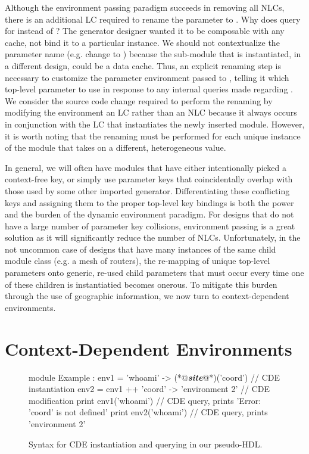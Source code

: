 Although the environment passing paradigm succeeds in removing all NLCs,
there is an additional LC required to rename the  parameter to .
Why does  query for  instead of ?
The generator designer wanted it to be composable with any cache, not bind it to a particular instance.
We should not contextualize the parameter name (e.g. change  to ) because the sub-module that is instantiated, in a different design, could be a data cache. 
Thus, an explicit renaming step is necessary to customize the parameter environment passed to , telling it which top-level parameter to use
in response to any internal queries made regarding .
We consider the source code change required to perform the renaming by modifying the environment an LC rather than an NLC because it always occurs in conjunction
with the LC that instantiates the newly inserted module.
However, it is worth noting that the renaming must be performed for each unique instance of the module that takes on a different, heterogeneous value.

In general, we will often have modules that have either intentionally picked a context-free key, or simply use parameter keys that coincidentally overlap with those
used by some other imported generator.
Differentiating these conflicting keys and assigning them to the proper top-level key bindings is both the power and the burden of the dynamic environment paradigm.
For designs that do not have a large number of parameter key collisions, environment passing is a great solution as it will significantly reduce the number of NLCs. 
Unfortunately, in the not uncommon case of designs that have many instances of the same child module class (e.g. a mesh of routers), the re-mapping of unique top-level parameters onto generic, re-used child parameters
that must occur every time one of these children is instantiatied becomes onerous.
To mitigate this burden through the use of geographic information, we now turn to context-dependent environments.

\section{Context-Dependent Environments}
\label{sec:cde}

\begin{figure}
\centering
\begin{phdl}
module Example :
  env1 = {'whoami' -> (*@\textcolor[rgb]{1,0.5,0}{\textbf{\textit{site}}}@*)('coord')}                // CDE instantiation
  env2 = env1 ++ {'coord' -> 'environment 2'} // CDE modification
  print env1('whoami')                        // CDE query, prints 'Error: 'coord' is not defined'
  print env2('whoami')                        // CDE query, prints 'environment 2'
\end{phdl}
\caption{Syntax for CDE instantiation and querying in our pseudo-HDL.}
\label{fig:cde-phdl}
\end{figure}

